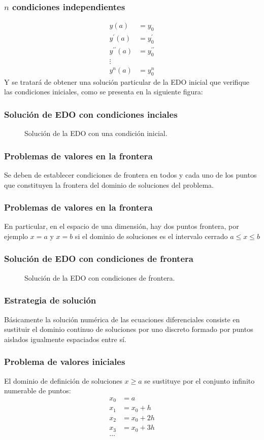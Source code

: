 \begin{frame}
\frametitle{$n$ condiciones independientes}
\begin{align*}
y(a) & = y_{0} \\
y^{\prime}(a) & = y^{\prime}_{0} \\
y^{\prime \prime}(a) & = y^{\prime \prime}_{0} \\
\vdots \\
y^{n}(a) & = y^{n}_{0}
\end{align*}
Y se tratará de obtener una solución particular de la EDO inicial que verifique las condiciones iniciales, como se presenta en la siguiente figura:
\end{frame}
\begin{frame}[fragile]
\frametitle{Solución de EDO con condiciones inciales}
\begin{figure}
	\centering
	
	\caption{Solución de la EDO con una condición inicial.}
\end{figure}
\end{frame}
\begin{frame}
\frametitle{Problemas de valores en la frontera}
Se deben de establecer condiciones de frontera en todos y cada uno de los puntos que constituyen la frontera del dominio de soluciones del problema.
\end{frame}
\begin{frame}
\frametitle{Problemas de valores en la frontera}
En particular, en el espacio de una dimensión, hay dos puntos frontera, por ejemplo $x=a$ y $x=b$ si el dominio de soluciones es el intervalo cerrado $a \leq x \leq b$
\end{frame}
\begin{frame}[fragile]
\frametitle{Solución de EDO con condiciones de frontera}
\begin{figure}
	\centering
	
	\caption{Solución de la EDO con condiciones de frontera.}
\end{figure}
\end{frame}
\begin{frame}
\frametitle{Estrategia de solución}
Básicamente la solución numérica de las ecuaciones diferenciales consiste en sustituir el dominio continuo de soluciones por uno discreto formado por puntos aislados igualmente espaciados entre sí.
\end{frame}
\begin{frame}
\frametitle{Problema de valores iniciales}
El dominio de definición de soluciones $x \geq a$  se sustituye por el conjunto infinito numerable de puntos:
\begin{align*}
x_{0} & = a \\
x_{1} & = x_{0} + h \\
x_{2} & = x_{0} + 2h \\
x_{3} & = x_{0} + 3h \\
\ldots
\end{align*}
\end{frame}
